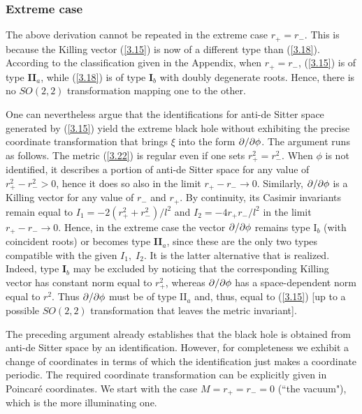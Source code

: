 
\subsubsection{Extreme case}

The above derivation cannot be repeated in the extreme case
$r_{+} = r_{-}$. This is because the Killing vector (\ref{3.15})
is now of a different type than (\ref{3.18}). According to the
classification given in the Appendix, when $r_{+} = r_{-}$,
(\ref{3.15}) is of type {\bf II}$_a$, while (\ref{3.18}) is of type
{\bf I}$_b$ with doubly degenerate roots. Hence, there is no
$SO(2,2)$ transformation mapping one to the other.

One can nevertheless argue that the identifications for anti-de
Sitter space generated by (\ref{3.15}) yield the extreme black
hole without exhibiting the precise coordinate transformation
that brings $\xi$ into the form $\partial /\partial \phi$. The argument runs
as follows.  The metric (\ref{3.22}) is regular even if one sets
$r_{+}^2 = r_{-}^2$. When $\phi$ is not identified, it describes
a portion of anti-de Sitter space for any value of $r_{+}^2 -
r_{-}^2 >0$, hence it does so also in the limit $r_+-r_-
\rightarrow 0$.  Similarly, $\partial /\partial \phi$ is a Killing vector
for any value of $r_{-}$ and $r_{+}$.  By continuity, its Casimir
invariants remain equal to $I_1= -2(r_{+}^2 +r_{-}^2)/l^2$ and
$I_2= - 4r_{+}r_{-}/l^2$ in the limit $r_{+} - r_{-} \rightarrow
0$. Hence, in the extreme case the vector $\partial /\partial \phi$ remains
type I$_b$ (with coincident roots) or becomes type {\bf
II}$_a$, since these are the only two types compatible with the
given $I_1,\; I_2$. It is the latter alternative that is
realized. Indeed, type {\bf I}$_b$ may be excluded by noticing
that the corresponding Killing vector has constant norm equal to
$r_{+}^2$, whereas $\partial /\partial \phi$ has a space-dependent norm
equal to $r^2$. Thus $\partial /\partial \phi$ must be of type II$_a$ and,
thus, equal to (\ref{3.15}) [up to a possible $SO(2,2)$
transformation that leaves the metric invariant].

The preceding argument already establishes that the black hole
is obtained from anti-de Sitter space by an identification.
However, for completeness we exhibit a change of coordinates
in terms of which the identification just makes a coordinate
periodic.  The required coordinate transformation can be
explicitly given in Poincar\'e coordinates. We start with the
case $M= r_{+}=r_{-}=0$ (``the vacuum"), which is the more
illuminating one.

